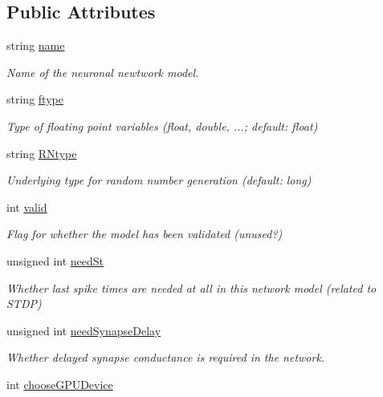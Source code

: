 \subsection*{Public Attributes}
\begin{DoxyCompactItemize}
\item 
string \hyperlink{classNNmodel_a7d81556b7b15a4a625b23f965944dae9}{name}
\begin{DoxyCompactList}\small\item\em Name of the neuronal newtwork model. \end{DoxyCompactList}\item 
string \hyperlink{classNNmodel_a917241001f3469a569dbb91aaa6a4039}{ftype}
\begin{DoxyCompactList}\small\item\em Type of floating point variables (float, double, ...; default\+: float) \end{DoxyCompactList}\item 
string \hyperlink{classNNmodel_ae02892a44b18e3ce913dc43dc31dd380}{R\+Ntype}
\begin{DoxyCompactList}\small\item\em Underlying type for random number generation (default\+: long) \end{DoxyCompactList}\item 
int \hyperlink{classNNmodel_ad09a7a4c3888876f7a95e8d5e344c71e}{valid}
\begin{DoxyCompactList}\small\item\em Flag for whether the model has been validated (unused?) \end{DoxyCompactList}\item 
unsigned int \hyperlink{classNNmodel_ab5f42229881455bed0f484b6d0211795}{need\+St}
\begin{DoxyCompactList}\small\item\em Whether last spike times are needed at all in this network model (related to S\+T\+D\+P) \end{DoxyCompactList}\item 
unsigned int \hyperlink{classNNmodel_aa6753d648bcac06109f0820349b5d2be}{need\+Synapse\+Delay}
\begin{DoxyCompactList}\small\item\em Whether delayed synapse conductance is required in the network. \end{DoxyCompactList}\item 
int \hyperlink{classNNmodel_a79631e0c13cdd5ebed55a16bea15819a}{choose\+G\+P\+U\+Device}
\item 

\end{DoxyCompactItemize}
